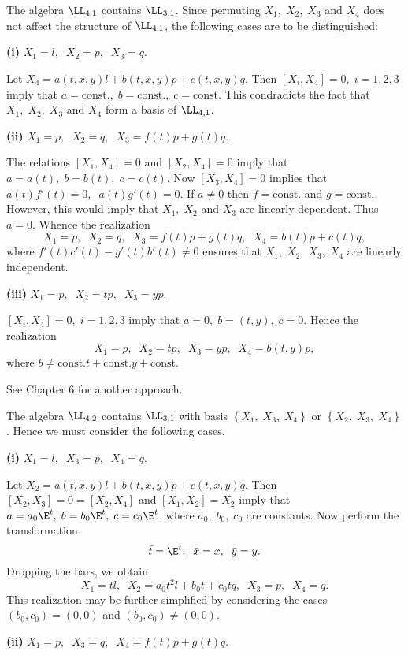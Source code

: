 
The algebra $\LL_{4,1}$ contains $\LL_{3,1}$. Since permuting $X_1,\;X_2,\;X_3$
and $X_4$ does not  affect the structure of $\LL_{4,1}$, the following
cases are to be distinguished:

{\bf (i) } $X_1=l,\;\;X_2=p,\;\;X_3=q.$

Let $X_4=a(t,x,y)l+b(t,x,y)p+c(t,x,y)q$. Then  $[X_i,X_4]=0,\;i=1,2,3$
imply that $a=\mbox{const.},\;b=\mbox{const.},\;c=\mbox{const}$. This
condradicts the fact that $X_1,\;X_2,\;X_3$ and $X_4$  form a basis of
$\LL_{4,1}$.

{\bf (ii)} $X_1=p,\;\;X_2=q,\;\;X_3=f(t)p+g(t)q$.

The relations $[X_1,X_4]=0$ and $[X_2,X_4]=0$ imply that $a=a(t),\;b=b(t),\;c=c(t)$. Now
$[X_3,X_4]=0$ implies that $a(t)f'(t)=0,\;\;a(t)g'(t)=0$. If $a\ne 0 $
then $f=\mbox{const.}$ and $g=\mbox{const}$. However, this would imply that 
$X_1,\; X_2$ and $X_3$ are linearly dependent. Thus $a=0$. Whence the
realization \[X_1=p,\;\;X_2=q,\;\;X_3=f(t)p+g(t)q,\;\;X_4=b(t)p+c(t)q,\]
where $f'(t)c'(t)-g'(t)b'(t)\ne 0$ ensures that $X_1,\;X_2,\;X_3,\;X_4$
are linearly independent.

{\bf (iii)} $X_1=p,\;\;X_2=tp,\;\;X_3=yp.$

$[X_i,X_4]=0,\;i=1,2,3$ imply that $a=0,\;b=(t,y),\;c=0$. Hence the
realization \[X_1=p,\;\;X_2=tp,\;\;X_3=yp,\;\;X_4=b(t,y)p,\] where $b\ne
\mbox{const.}t+\mbox{const.}y+\mbox{const.}$

See Chapter 6 for another approach.


The algebra $\LL_{4,2}$ contains $\LL_{3,1}$ with basis
$\left \{X_1,\;X_3,\;X_4 \right \}$ or $\left \{X_2,\;X_3,\;X_4 \right
\}$. Hence we must consider the following cases.

{\bf (i)} $X_1=l,\;\;X_3=p,\;\;X_4=q.$

Let $X_2=a(t,x,y)l+b(t,x,y)p+c(t,x,y)q$. Then
$[X_2,X_3]=0=[X_2,X_4]$ and $[X_1,X_2]=X_2$ imply that $
a=a_0\E^t,\;b=b_0\E^t,\; c=c_0\E^t$, where $a_0,\;b_0,\;c_0$ are
constants. Now perform the transformation
\[ \bar t=
\E^t,\;\;\bar x =x,\;\; \bar y=y.\]
Dropping the bars, we obtain
\[X_1=tl,\;\;X_2=a_0t^2l+b_0t+c_0tq,\;\;X_3=p,\;\;X_4=q.\] This
realization may be further simplified  by considering the cases
$(b_0,c_0)=(0,0)$ and $(b_0,c_0)\ne (0,0)$.

{\bf (ii)} $X_1=p,\;\;X_3=q,\;\;X_4=f(t)p+g(t)q.$

